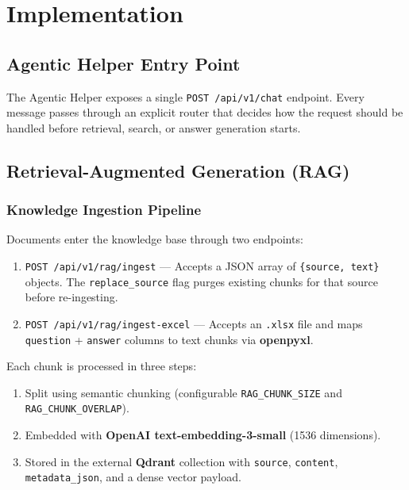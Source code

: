 \section{Implementation}

\subsection{Agentic Helper Entry Point}

The Agentic Helper exposes a single \texttt{POST /api/v1/chat} endpoint. Every message passes
through an explicit router that decides how the request should be handled before retrieval,
search, or answer generation starts.

\subsection{Retrieval-Augmented Generation (RAG)}

\subsubsection{Knowledge Ingestion Pipeline}

Documents enter the knowledge base through two endpoints:

\begin{enumerate}
  \item \texttt{POST /api/v1/rag/ingest} — Accepts a JSON array of \texttt{\{source, text\}}
    objects. The \texttt{replace\_source} flag purges existing chunks for that source before
    re-ingesting.
  \item \texttt{POST /api/v1/rag/ingest-excel} — Accepts an \texttt{.xlsx} file and maps
    \texttt{question} + \texttt{answer} columns to text chunks via \textbf{openpyxl}.
\end{enumerate}

Each chunk is processed in three steps:
\begin{enumerate}
  \item Split using semantic chunking (configurable \texttt{RAG\_CHUNK\_SIZE} and
    \texttt{RAG\_CHUNK\_OVERLAP}).
  \item Embedded with \textbf{OpenAI text-embedding-3-small} (1536 dimensions).
  \item Stored in the external \textbf{Qdrant} collection with \texttt{source},
    \texttt{content}, \texttt{metadata\_json}, and a dense vector payload.
\end{enumerate}


